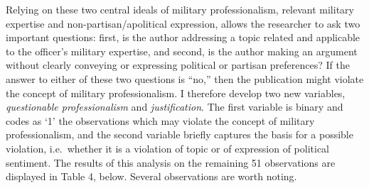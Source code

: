 \documentclass[12pt,]{article}
\begin{document}
Relying on these two central ideals of military professionalism, relevant military expertise and non-partisan/apolitical expression, allows the researcher to ask two important questions: first, is the author addressing a topic related and applicable to the officer's military expertise, and second, is the author making an argument without clearly conveying or expressing political or partisan preferences? If the answer to either of these two questions is ``no,'' then the publication might violate the concept of military professionalism. I therefore develop two new variables, \emph{questionable professionalism} and \emph{justification}. The first variable is binary and codes as `1' the observations which may violate the concept of military professionalism, and the second variable briefly captures the basis for a possible violation, i.e.~whether it is a violation of topic or of expression of political sentiment. The results of this analysis on the remaining 51 observations are displayed in Table 4, below. Several observations are worth noting.

\singlespace
\begingroup\fontsize{10}{12}\selectfont
\end{document}
